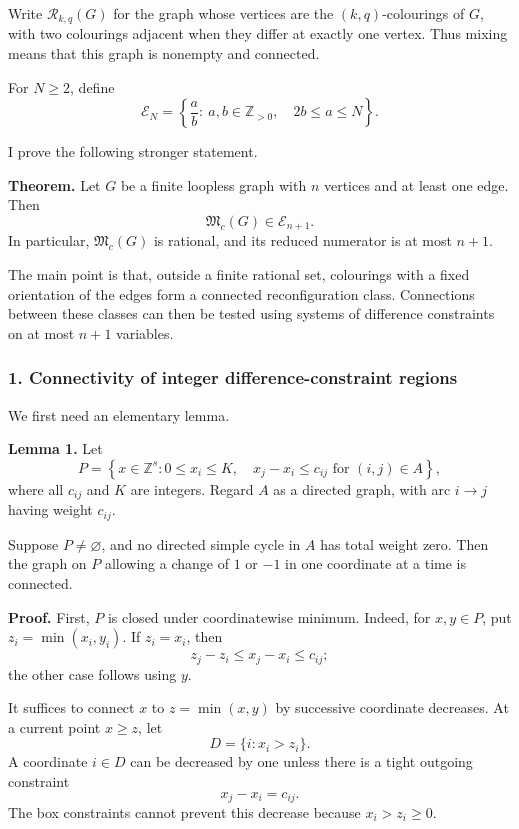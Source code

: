 \documentclass[
  11pt,
  a4paper,
]{article}
\newcounter{none} %
\begin{document}
Write \(\mathcal R_{k,q}(G)\) for the graph whose vertices are the
\((k,q)\)-colourings of \(G\), with two colourings adjacent when they
differ at exactly one vertex. Thus mixing means that this graph is
nonempty and connected.

For \(N\ge 2\), define \[
\mathcal E_N
=
\left\{\frac ab:\ a,b\in\mathbb Z_{>0},\quad 2b\le a\le N\right\}.
\]

I prove the following stronger statement.

\textbf{Theorem.} Let \(G\) be a finite loopless graph with \(n\)
vertices and at least one edge. Then \[
\boxed{\mathfrak M_c(G)\in\mathcal E_{n+1}.}
\] In particular, \(\mathfrak M_c(G)\) is rational, and its reduced
numerator is at most \(n+1\).

The main point is that, outside a finite rational set, colourings with a
fixed orientation of the edges form a connected reconfiguration class.
Connections between these classes can then be tested using systems of
difference constraints on at most \(n+1\) variables.

\subsubsection{1. Connectivity of integer difference-constraint
regions}\label{connectivity-of-integer-difference-constraint-regions}

We first need an elementary lemma.

\textbf{Lemma 1.} Let \[
P=\left\{x\in\mathbb Z^s:
0\le x_i\le K,\quad
x_j-x_i\le c_{ij}\text{ for }(i,j)\in A
\right\},
\] where all \(c_{ij}\) and \(K\) are integers. Regard \(A\) as a
directed graph, with arc \(i\to j\) having weight \(c_{ij}\).

Suppose \(P\ne\varnothing\), and no directed simple cycle in \(A\) has
total weight zero. Then the graph on \(P\) allowing a change of \(1\) or
\(-1\) in one coordinate at a time is connected.

\textbf{Proof.} First, \(P\) is closed under coordinatewise minimum.
Indeed, for \(x,y\in P\), put \(z_i=\min(x_i,y_i)\). If \(z_i=x_i\),
then \[
z_j-z_i\le x_j-x_i\le c_{ij};
\] the other case follows using \(y\).

It suffices to connect \(x\) to \(z=\min(x,y)\) by successive coordinate
decreases. At a current point \(x\ge z\), let \[
D=\{i:x_i>z_i\}.
\] A coordinate \(i\in D\) can be decreased by one unless there is a
tight outgoing constraint \[
x_j-x_i=c_{ij}.
\] The box constraints cannot prevent this decrease because
\(x_i>z_i\ge0\).
\end{document}
